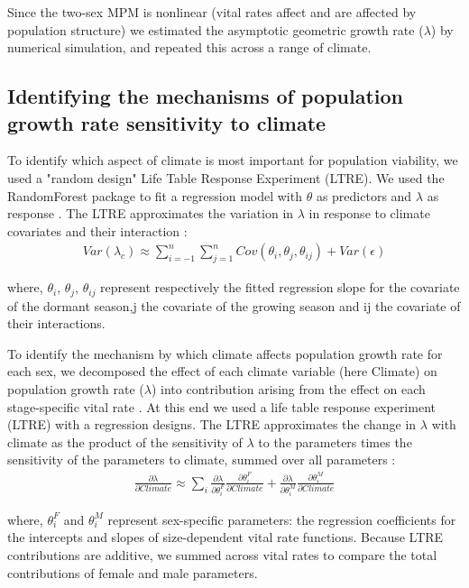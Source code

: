 \documentclass[12pt]{article}
\begin{document}
Since the two-sex MPM is nonlinear (vital rates affect and are affected by population structure) we estimated the asymptotic geometric growth rate ($\lambda$) by numerical simulation, and repeated this across a range of climate.

\subsection*{Identifying the mechanisms of population growth rate sensitivity to climate }
To identify which aspect of climate is most important for population viability, we used a "random design" Life Table Response Experiment (LTRE). 
We used the RandomForest package to fit a regression model with $\theta$ as predictors  and $\lambda$ as response \citep{ellner2016data,liaw2002classification}.
The LTRE approximates the variation in $\lambda$ in response to climate covariates and their interaction \citep{caswell2000matrix,hernandez2023exact}:
\begin{align}\label{eq:ltre}
Var(\lambda_{c})\approx \sum_{i=-1}^{n}\sum_{j=1}^{n} Cov(\theta_{i},\theta_{j},\theta_{ij}) + Var (\epsilon)
\end{align}

\noindent where, $\theta_{i}$, $\theta_{j}$, $\theta_{ij}$  represent respectively the fitted regression slope for the covariate of the dormant season,j the covariate of the growing season and ij the covariate of their interactions. 

To identify the mechanism by which climate affects population growth rate for each sex, we decomposed the effect of each climate variable (here Climate) on population growth rate ($\lambda$) into contribution arising from the effect on each stage-specific vital rate \citep{caswell2000matrix}.
At this end we used a life table response experiment (LTRE) with a regression designs. 
The LTRE approximates the change in $\lambda$ with climate  as the product of the sensitivity of $\lambda$ to the parameters times the sensitivity of the parameters to climate, summed over all parameters \citep{caswell1989analysis}:
\begin{align}\label{eq:ltresex}
\frac{\partial \lambda}{\partial Climate} \approx \sum_{i} \frac{\partial \lambda}{\partial \theta^{F}_{i}} \frac{\partial \theta^{F}_{i}}{\partial Climate} + \frac{\partial \lambda}{\partial \theta^{M}_{i}} \frac{\partial \theta^{M}_{i}}{\partial Climate}
\end{align}

\noindent where, $\theta^{F}_{i}$ and $\theta^{M}_{i}$ represent sex-specific parameters: the regression coefficients for the intercepts and slopes of size-dependent vital rate functions. 
Because LTRE contributions are additive, we summed across vital rates to compare the total contributions of female and male parameters. 
\end{document}
